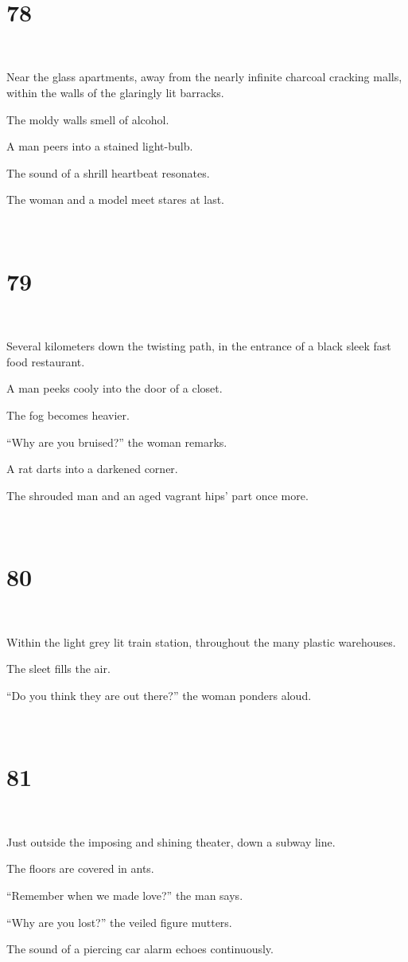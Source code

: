 \documentclass{report}
\begin{document}
~
\chapter*{78}
~

Near the glass apartments, away from the nearly infinite charcoal cracking malls, within the walls of the glaringly lit barracks.

The moldy walls smell of alcohol.

A man peers into a stained light-bulb.

The sound of a shrill heartbeat resonates.

The woman and a model meet stares at last.

~
\chapter*{79}
~

Several kilometers down the twisting path, in the entrance of a black sleek fast food restaurant.

A man peeks cooly into the door of a closet.

The fog becomes heavier.

``Why are you bruised?'' the woman remarks.

A rat darts into a darkened corner.

The shrouded man and an aged vagrant hips' part once more.

~
\chapter*{80}
~

Within the light grey lit train station, throughout the many plastic warehouses.

The sleet fills the air.

``Do you think they are out there?'' the woman ponders aloud.

~
\chapter*{81}
~

Just outside the imposing and shining theater, down a subway line.

The floors are covered in ants.

``Remember when we made love?'' the man says.

``Why are you lost?'' the veiled figure mutters.

The sound of a piercing car alarm echoes continuously.
\end{document}
